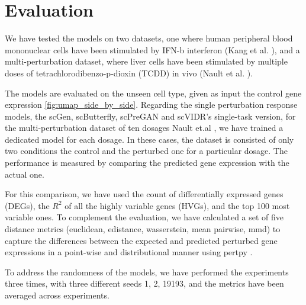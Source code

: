 \documentclass[12pt, a4paper]{article}
\begin{document}
\section{Evaluation}



We have tested the models on two datasets, one where human peripheral blood mononuclear cells have been stimulated by IFN-b interferon (Kang et al. \cite{kanaGenerativeModelingSinglecell2023}), and a multi-perturbation dataset, where liver cells have been stimulated by multiple doses of tetrachlorodibenzo-p-dioxin (TCDD) in vivo (Nault et al. \cite{nault2021single,nault2022benchmarking}).

The models are evaluated on the unseen cell type, given as input the control gene expression \cref{fig:umap_side_by_side}.
Regarding the single perturbation response models, the scGen, scButterfly, scPreGAN and scVIDR's single-task version, for the multi-perturbation dataset of ten dosages Nault et.al \cite{nault2021single,nault2022benchmarking}, we have trained a dedicated model for each dosage. In these cases, the dataset is consisted of only two conditions the control and the perturbed one for a particular dosage. The performance is measured by comparing the predicted gene expression with the actual one.

For this comparison, we have used the count of differentially expressed genes (DEGs), the $R^2$ of all the highly variable genes (HVGs), and the top 100 most variable ones. To complement the evaluation, we have calculated a set of five distance metrics (euclidean, edistance, wasserstein, mean pairwise, mmd) to capture the differences between the expected and predicted perturbed gene expressions in a point-wise and distributional manner using pertpy \cite{heumos2024pertpy}.

To address the randomness of the models, we have performed the experiments three times, with three different seeds 1, 2, 19193, and the metrics have been averaged across experiments.
\end{document}
